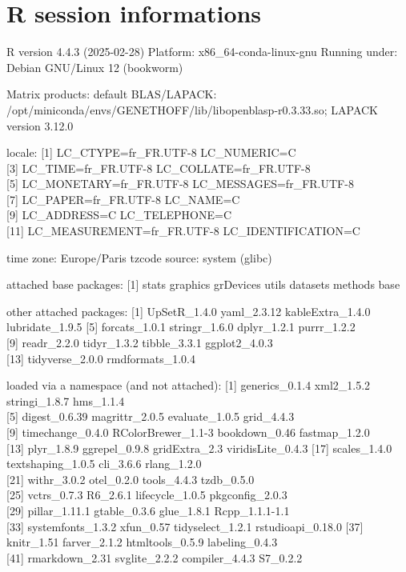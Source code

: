 \documentclass[
]{article}
\begin{document}
\section{R session informations}\label{r-session-informations}

R version 4.4.3 (2025-02-28) Platform: x86\_64-conda-linux-gnu Running
under: Debian GNU/Linux 12 (bookworm)

Matrix products: default BLAS/LAPACK:
/opt/miniconda/envs/GENETHOFF/lib/libopenblasp-r0.3.33.so; LAPACK
version 3.12.0

locale: {[}1{]} LC\_CTYPE=fr\_FR.UTF-8 LC\_NUMERIC=C\\
{[}3{]} LC\_TIME=fr\_FR.UTF-8 LC\_COLLATE=fr\_FR.UTF-8\\
{[}5{]} LC\_MONETARY=fr\_FR.UTF-8 LC\_MESSAGES=fr\_FR.UTF-8\\
{[}7{]} LC\_PAPER=fr\_FR.UTF-8 LC\_NAME=C\\
{[}9{]} LC\_ADDRESS=C LC\_TELEPHONE=C\\
{[}11{]} LC\_MEASUREMENT=fr\_FR.UTF-8 LC\_IDENTIFICATION=C

time zone: Europe/Paris tzcode source: system (glibc)

attached base packages: {[}1{]} stats graphics grDevices utils datasets
methods base

other attached packages: {[}1{]} UpSetR\_1.4.0 yaml\_2.3.12
kableExtra\_1.4.0 lubridate\_1.9.5 {[}5{]} forcats\_1.0.1 stringr\_1.6.0
dplyr\_1.2.1 purrr\_1.2.2\\
{[}9{]} readr\_2.2.0 tidyr\_1.3.2 tibble\_3.3.1 ggplot2\_4.0.3\\
{[}13{]} tidyverse\_2.0.0 rmdformats\_1.0.4

loaded via a namespace (and not attached): {[}1{]} generics\_0.1.4
xml2\_1.5.2 stringi\_1.8.7 hms\_1.1.4\\
{[}5{]} digest\_0.6.39 magrittr\_2.0.5 evaluate\_1.0.5 grid\_4.4.3\\
{[}9{]} timechange\_0.4.0 RColorBrewer\_1.1-3 bookdown\_0.46
fastmap\_1.2.0\\
{[}13{]} plyr\_1.8.9 ggrepel\_0.9.8 gridExtra\_2.3 viridisLite\_0.4.3
{[}17{]} scales\_1.4.0 textshaping\_1.0.5 cli\_3.6.6 rlang\_1.2.0\\
{[}21{]} withr\_3.0.2 otel\_0.2.0 tools\_4.4.3 tzdb\_0.5.0\\
{[}25{]} vctrs\_0.7.3 R6\_2.6.1 lifecycle\_1.0.5 pkgconfig\_2.0.3\\
{[}29{]} pillar\_1.11.1 gtable\_0.3.6 glue\_1.8.1 Rcpp\_1.1.1-1.1\\
{[}33{]} systemfonts\_1.3.2 xfun\_0.57 tidyselect\_1.2.1
rstudioapi\_0.18.0 {[}37{]} knitr\_1.51 farver\_2.1.2 htmltools\_0.5.9
labeling\_0.4.3\\
{[}41{]} rmarkdown\_2.31 svglite\_2.2.2 compiler\_4.4.3 S7\_0.2.2
\end{document}
